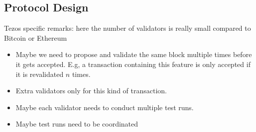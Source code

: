 \documentclass{article}
\newenvironment{changethis}{%
  \begin{tcolorbox}[breakable,notitle,boxrule=0pt,colback=blue!20,colframe=blue!20]}{%
  \end{tcolorbox}}
\begin{document}
\subsection{Protocol Design}
\label{sec:protocol-design}

\begin{changethis}
  Tezos specific remarks: here the number of validators is really small compared to
  Bitcoin or Ethereum
  \begin{itemize}
  \item Maybe we need to propose and validate the same block multiple times before it
    gets accepted. E.g, a transaction containing this feature is only accepted if it is
    revalidated $n$ times.
  \item Extra validators only for this kind of transaction.
  \item Maybe each validator needs to conduct multiple test runs.
  \item Maybe test runs need to be coordinated
  \end{itemize}
\end{changethis}
\end{document}
